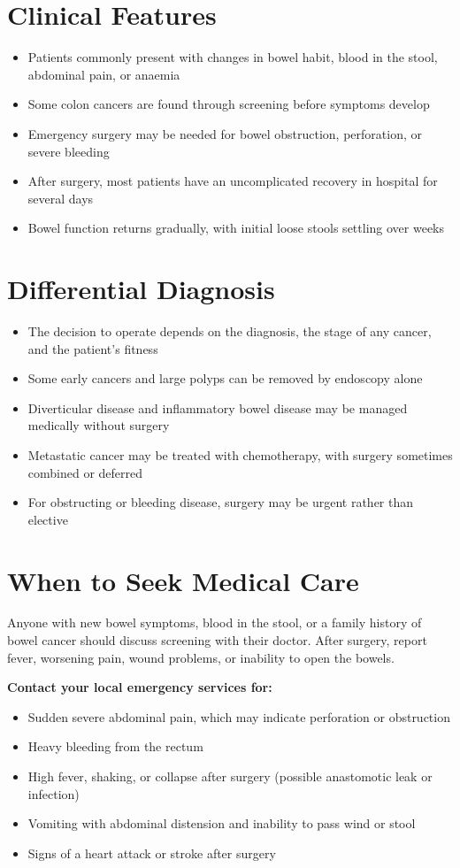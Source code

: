 \section*{Clinical Features}
\begin{itemize}
    \item Patients commonly present with changes in bowel habit, blood in the stool, abdominal pain, or anaemia
    \item Some colon cancers are found through screening before symptoms develop
    \item Emergency surgery may be needed for bowel obstruction, perforation, or severe bleeding
    \item After surgery, most patients have an uncomplicated recovery in hospital for several days
    \item Bowel function returns gradually, with initial loose stools settling over weeks
\end{itemize}

\section*{Differential Diagnosis}
\begin{itemize}
    \item The decision to operate depends on the diagnosis, the stage of any cancer, and the patient's fitness
    \item Some early cancers and large polyps can be removed by endoscopy alone
    \item Diverticular disease and inflammatory bowel disease may be managed medically without surgery
    \item Metastatic cancer may be treated with chemotherapy, with surgery sometimes combined or deferred
    \item For obstructing or bleeding disease, surgery may be urgent rather than elective
\end{itemize}

\section*{When to Seek Medical Care}
Anyone with new bowel symptoms, blood in the stool, or a family history of bowel cancer should discuss screening with their doctor. After surgery, report fever, worsening pain, wound problems, or inability to open the bowels.

\textbf{Contact your local emergency services for:}
\begin{itemize}
    \item Sudden severe abdominal pain, which may indicate perforation or obstruction
    \item Heavy bleeding from the rectum
    \item High fever, shaking, or collapse after surgery (possible anastomotic leak or infection)
    \item Vomiting with abdominal distension and inability to pass wind or stool
    \item Signs of a heart attack or stroke after surgery
\end{itemize}

